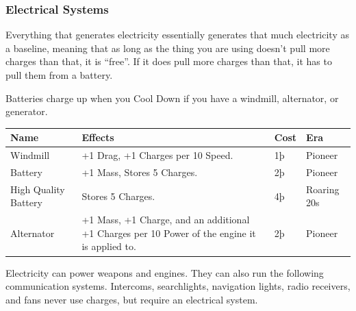 \documentclass{article}
\begin{document}
\subsubsection{Electrical Systems}
\label{_Electrical Systems}

Everything that generates electricity essentially generates that much
electricity as a baseline, meaning that as long as the thing you are
using doesn't pull more charges than that, it is ``free''. If it does
pull more charges than that, it has to pull them from a battery.

\hfill\break
Batteries charge up when you Cool Down if you have a windmill,
alternator, or generator.

\begin{tabular}{|l|l|l|l|}
    \hline
    Name                                  & Effects                                                 & Cost    & Era         \\\hline
    Windmill                              & +1 Drag, +1 Charges per 10 Speed.                       & 1þ      & Pioneer     \\\hline
    Battery                               & +1 Mass, Stores 5 Charges.                              & 2þ      & Pioneer     \\\hline
    High Quality Battery                  & Stores 5 Charges.                                       & 4þ      & Roaring 20s \\\hline
    Alternator                            & +1 Mass, +1 Charge, and an additional +1 Charges per 10
    Power of the engine it is applied to. & 2þ                                                      & Pioneer               \\\hline
\end{tabular}

Electricity can power weapons and engines. They can also run the
following communication systems. Intercoms, searchlights, navigation
lights, radio receivers, and fans never use charges, but require an
electrical system.
\end{document}
